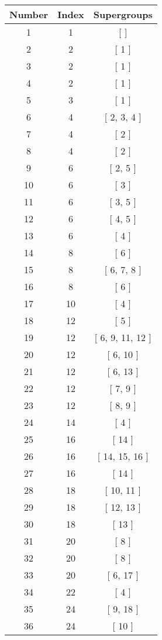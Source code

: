 \begin{center}
\begin{longtable}[H]{|| c c c ||}
\hline
Number &  Index &  Supergroups
\\\hline
1 & 1 & [  ]
\\\hline
2 & 2 & [ 1 ]
\\\hline
3 & 2 & [ 1 ]
\\\hline
4 & 2 & [ 1 ]
\\\hline
5 & 3 & [ 1 ]
\\\hline
6 & 4 & [ 2, 3, 4 ]
\\\hline
7 & 4 & [ 2 ]
\\\hline
8 & 4 & [ 2 ]
\\\hline
9 & 6 & [ 2, 5 ]
\\\hline
10 & 6 & [ 3 ]
\\\hline
11 & 6 & [ 3, 5 ]
\\\hline
12 & 6 & [ 4, 5 ]
\\\hline
13 & 6 & [ 4 ]
\\\hline
14 & 8 & [ 6 ]
\\\hline
15 & 8 & [ 6, 7, 8 ]
\\\hline
16 & 8 & [ 6 ]
\\\hline
17 & 10 & [ 4 ]
\\\hline
18 & 12 & [ 5 ]
\\\hline
19 & 12 & [ 6, 9, 11, 12 ]
\\\hline
20 & 12 & [ 6, 10 ]
\\\hline
21 & 12 & [ 6, 13 ]
\\\hline
22 & 12 & [ 7, 9 ]
\\\hline
23 & 12 & [ 8, 9 ]
\\\hline
24 & 14 & [ 4 ]
\\\hline
25 & 16 & [ 14 ]
\\\hline
26 & 16 & [ 14, 15, 16 ]
\\\hline
27 & 16 & [ 14 ]
\\\hline
28 & 18 & [ 10, 11 ]
\\\hline
29 & 18 & [ 12, 13 ]
\\\hline
30 & 18 & [ 13 ]
\\\hline
31 & 20 & [ 8 ]
\\\hline
32 & 20 & [ 8 ]
\\\hline
33 & 20 & [ 6, 17 ]
\\\hline
34 & 22 & [ 4 ]
\\\hline
35 & 24 & [ 9, 18 ]
\\\hline
36 & 24 & [ 10 ]
\\\hline

\end{longtable}
\end{center}
